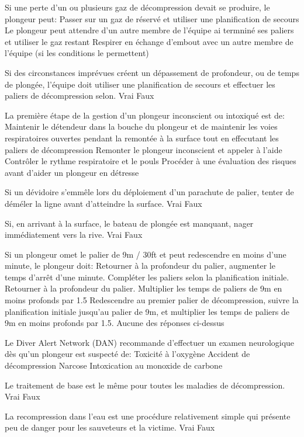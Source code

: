 \documentclass[english,10pt,a4paper,twoside]{article}
\begin{document}
\begin{outline}
		\1 Si une perte d'un ou plusieurs gaz de décompression devait se produire, le plongeur peut:
			\2 Passer sur un gaz de réservé et utiliser une planification de secours
			\2 Le plongeur peut attendre d'un autre membre de l'équipe ai termniné ses paliers et utiliser le gaz restant
			\2 Respirer en échange d'embout avec un autre membre de l'équipe (si les conditions le permettent)

		\1 Si des circonstances imprévues créent un dépassement de profondeur, ou de temps de plongée, l'équipe doit utiliser une planification de secours et effectuer les paliers de décompression selon.
			\2 Vrai
			\2 Faux

		\1 La première étape de la gestion d'un plongeur inconscient ou intoxiqué est de:
			\2 Maintenir le détendeur dans la bouche du plongeur et de maintenir les voies respiratoires ouvertes pendant la remontée à la surface tout en effecutant les paliers de décompression
			\2 Remonter le plongeur inconscient et appeler à l'aide
			\2 Contrôler le rythme respiratoire et le pouls
			\2 Procéder à une évaluation des risques avant d'aider un plongeur en détresse

		\1 Si un dévidoire s'emmêle lors du déploiement d'un parachute de palier, tenter de déméler la ligne avant d'atteindre la surface.
			\2 Vrai
			\2 Faux

		\1 Si, en arrivant à la surface, le bateau de plongée est manquant, nager immédiatement vers la rive.
			\2 Vrai
			\2 Faux

		\1 Si un plongeur omet le palier de 9m / 30ft et peut redescendre en moins d'une minute, le plongeur doit:
			\2 Retourner à la profondeur du palier, augmenter le temps d'arrêt d'une minute. Compléter les paliers selon la planification initiale.
			\2 Retourner à la profondeur du palier. Multiplier les temps de paliers de 9m en moins profonds par 1.5
			\2 Redescendre au premier palier de décompression, suivre la planification initiale jusqu'au palier de 9m, et multiplier les temps de paliers de 9m en moins profonds par 1.5.
			\2 Aucune des réponses ci-dessus

		\1 Le Diver Alert Network (DAN) recommande d'effectuer un examen neurologique dès qu'un plongeur est suspecté de:
			\2 Toxicité à l'oxygène
			\2 Accident de décompression
			\2 Narcose
			\2 Intoxication au monoxide de carbone

		\1 Le traitement de base est le même pour toutes les maladies de décompression.
			\2 Vrai
			\2 Faux

		\1 La recompression dans l'eau est une procédure relativement simple qui présente peu de danger pour les sauveteurs et la victime.
			\2 Vrai
			\2 Faux
	\end{outline}
	\vfill
	\pagebreak
\end{document}
